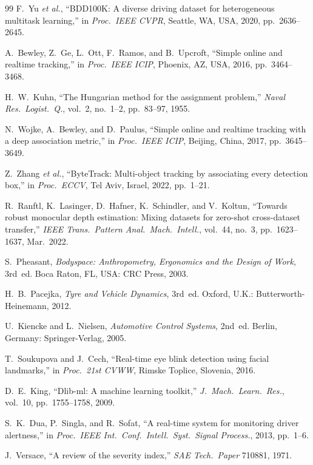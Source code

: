 \documentclass[journal]{IEEEtran}
\newcommand{\etal}{\textit{et al.}}
\begin{document}
\begin{thebibliography}{99}
F.~Yu \etal,
``BDD100K: A diverse driving dataset for heterogeneous multitask
learning,''
in \textit{Proc.\ IEEE CVPR}, Seattle, WA, USA, 2020, pp.~2636--2645.

A.~Bewley, Z.~Ge, L.~Ott, F.~Ramos, and B.~Upcroft,
``Simple online and realtime tracking,''
in \textit{Proc.\ IEEE ICIP}, Phoenix, AZ, USA, 2016,
pp.~3464--3468.

H.~W.~Kuhn,
``The Hungarian method for the assignment problem,''
\textit{Naval Res.\ Logist.\ Q.}, vol.~2, no.~1--2, pp.~83--97, 1955.

N.~Wojke, A.~Bewley, and D.~Paulus,
``Simple online and realtime tracking with a deep association metric,''
in \textit{Proc.\ IEEE ICIP}, Beijing, China, 2017, pp.~3645--3649.

Z.~Zhang \etal,
``ByteTrack: Multi-object tracking by associating every detection box,''
in \textit{Proc.\ ECCV}, Tel Aviv, Israel, 2022, pp.~1--21.

R.~Ranftl, K.~Lasinger, D.~Hafner, K.~Schindler, and V.~Koltun,
``Towards robust monocular depth estimation: Mixing datasets for
zero-shot cross-dataset transfer,''
\textit{IEEE Trans.\ Pattern Anal.\ Mach.\ Intell.}, vol.~44, no.~3,
pp.~1623--1637, Mar.~2022.

S.~Pheasant,
\textit{Bodyspace: Anthropometry, Ergonomics and the Design of Work},
3rd~ed. Boca Raton, FL, USA: CRC Press, 2003.

H.~B.~Pacejka,
\textit{Tyre and Vehicle Dynamics}, 3rd~ed.
Oxford, U.K.: Butterworth-Heinemann, 2012.

U.~Kiencke and L.~Nielsen,
\textit{Automotive Control Systems}, 2nd~ed.
Berlin, Germany: Springer-Verlag, 2005.

T.~Soukupova and J.~Cech,
``Real-time eye blink detection using facial landmarks,''
in \textit{Proc.\ 21st CVWW}, Rimske Toplice, Slovenia, 2016.

D.~E.~King,
``Dlib-ml: A machine learning toolkit,''
\textit{J.\ Mach.\ Learn.\ Res.}, vol.~10, pp.~1755--1758, 2009.

S.~K.~Dua, P.~Singla, and R.~Sofat,
``A real-time system for monitoring driver alertness,''
in \textit{Proc.\ IEEE Int.\ Conf.\ Intell.\ Syst.\ Signal Process.},
2013, pp.~1--6.

J.~Versace,
``A review of the severity index,''
\textit{SAE Tech.\ Paper} 710881, 1971.


\end{thebibliography}
\end{document}

